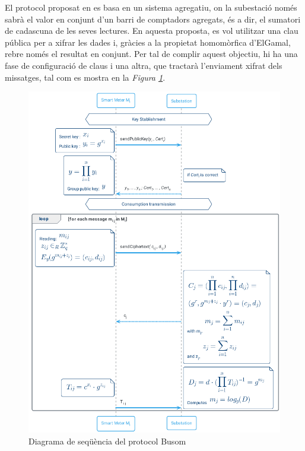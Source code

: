 

El protocol proposat en \cite{busom} es basa en un sistema agregatiu, on la subestació només sabrà el valor en conjunt d'un barri de comptadors agregats, és a dir, el sumatori de cadascuna de les seves lectures. En aquesta proposta, es vol utilitzar una clau pública per a xifrar les dades i, gràcies a la propietat homomòrfica d'ElGamal, rebre només el resultat en conjunt. Per tal de complir aquest objectiu, hi ha una fase de configuració de claus i una altra, que tractarà l'enviament xifrat dels missatges, tal com es mostra en la \textit{Figura \ref{fig:busom}}.
\begin{figure}
	\centering
	\includegraphics[width=14cm]{umls/busom.png}
	\caption{Diagrama de seqüència del protocol Busom}
	\label{fig:busom}
\end{figure}


